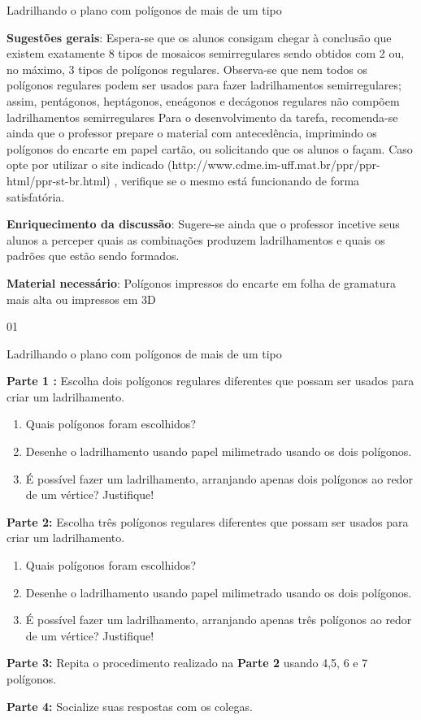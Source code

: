 \begin{sugestions}{Ladrilhando o plano com polígonos de mais de um tipo}
{
	\textbf{Sugestões gerais}: Espera-se que os alunos consigam chegar à conclusão que existem exatamente 8 tipos de mosaicos semirregulares sendo obtidos com 2 ou, no máximo, 3 tipos de polígonos regulares. Observa-se que nem todos os polígonos regulares podem ser usados para fazer ladrilhamentos semirregulares; assim, pentágonos, heptágonos, eneágonos e decágonos regulares não compõem ladrilhamentos semirregulares
	Para o desenvolvimento da tarefa, recomenda-se ainda que o professor prepare o material com antecedência, imprimindo os polígonos do encarte em papel cartão, ou solicitando que os alunos o façam. Caso opte por utilizar o site indicado (http://www.cdme.im-uff.mat.br/ppr/ppr-html/ppr-st-br.html) , verifique se o mesmo está funcionando de forma satisfatória. 
	 
	\textbf{Enriquecimento da discussão}: Sugere-se ainda que o professor incetive seus alunos a perceper quais as combinações produzem ladrilhamentos e quais os padrões que estão sendo formados.

	\textbf{Material necessário}: Polígonos impressos do encarte em folha de gramatura mais alta ou impressos em 3D	
}{0}{1}
\end{sugestions}




\begin{task}{Ladrilhando o plano com polígonos de mais de um tipo}\label{ladtipos}

\textbf{Parte 1 :} Escolha dois polígonos regulares diferentes que possam ser usados para criar um ladrilhamento. 
\begin{enumerate}
\item Quais polígonos foram escolhidos?
\item Desenhe o ladrilhamento usando papel milimetrado usando os dois polígonos. 
\item É possível fazer um ladrilhamento, arranjando  apenas dois polígonos ao redor de um vértice? Justifique! 
\end{enumerate}

\textbf{Parte 2:} Escolha três polígonos regulares diferentes que possam ser usados para criar um ladrilhamento. 
\begin{enumerate}
\item Quais polígonos foram escolhidos?
\item Desenhe o ladrilhamento usando papel milimetrado usando os dois polígonos. 
\item É possível fazer um ladrilhamento, arranjando  apenas três polígonos ao redor de um vértice? Justifique! 
\end{enumerate}


\textbf{Parte 3:} Repita o procedimento realizado na \textbf{Parte 2 }usando 4,5, 6 e 7 polígonos.

\textbf{Parte 4:} Socialize suas respostas com os colegas.

\end{task}


